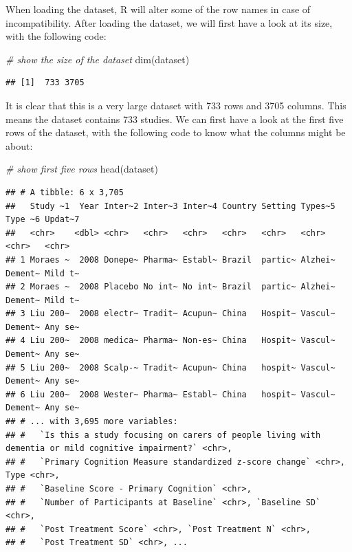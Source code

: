 \documentclass[
]{article}
\newenvironment{Shaded}{\begin{snugshade}}{\end{snugshade}}
\newcommand{\CommentTok}[1]{\textcolor[rgb]{0.56,0.35,0.01}{\textit{#1}}}
\newcommand{\FunctionTok}[1]{\textcolor[rgb]{0.00,0.00,0.00}{#1}}
\newcommand{\NormalTok}[1]{#1}
\begin{document}
When loading the dataset, R will alter some of the row names in case of
incompatibility. After loading the dataset, we will first have a look at
its size, with the following code:

\begin{Shaded}
\begin{Highlighting}[]
\CommentTok{\# show the size of the dataset}
\FunctionTok{dim}\NormalTok{(dataset)}
\end{Highlighting}
\end{Shaded}

\begin{verbatim}
## [1]  733 3705
\end{verbatim}

It is clear that this is a very large dataset with 733 rows and 3705
columns. This means the dataset contains 733 studies. We can first have
a look at the first five rows of the dataset, with the following code to
know what the columns might be about:

\begin{Shaded}
\begin{Highlighting}[]
\CommentTok{\# show first five rows}
\FunctionTok{head}\NormalTok{(dataset)}
\end{Highlighting}
\end{Shaded}

\begin{verbatim}
## # A tibble: 6 x 3,705
##   Study ~1  Year Inter~2 Inter~3 Inter~4 Country Setting Types~5 Type ~6 Updat~7
##   <chr>    <dbl> <chr>   <chr>   <chr>   <chr>   <chr>   <chr>   <chr>   <chr>  
## 1 Moraes ~  2008 Donepe~ Pharma~ Establ~ Brazil  partic~ Alzhei~ Dement~ Mild t~
## 2 Moraes ~  2008 Placebo No int~ No int~ Brazil  partic~ Alzhei~ Dement~ Mild t~
## 3 Liu 200~  2008 electr~ Tradit~ Acupun~ China   Hospit~ Vascul~ Dement~ Any se~
## 4 Liu 200~  2008 medica~ Pharma~ Non-es~ China   Hospit~ Vascul~ Dement~ Any se~
## 5 Liu 200~  2008 Scalp-~ Tradit~ Acupun~ China   hospit~ Vascul~ Dement~ Any se~
## 6 Liu 200~  2008 Wester~ Pharma~ Establ~ China   hospit~ Vascul~ Dement~ Any se~
## # ... with 3,695 more variables:
## #   `Is this a study focusing on carers of people living with dementia or mild cognitive impairment?` <chr>,
## #   `Primary Cognition Measure standardized z-score change` <chr>, Type <chr>,
## #   `Baseline Score - Primary Cognition` <chr>,
## #   `Number of Participants at Baseline` <chr>, `Baseline SD` <chr>,
## #   `Post Treatment Score` <chr>, `Post Treatment N` <chr>,
## #   `Post Treatment SD` <chr>, ...
\end{verbatim}
\end{document}
